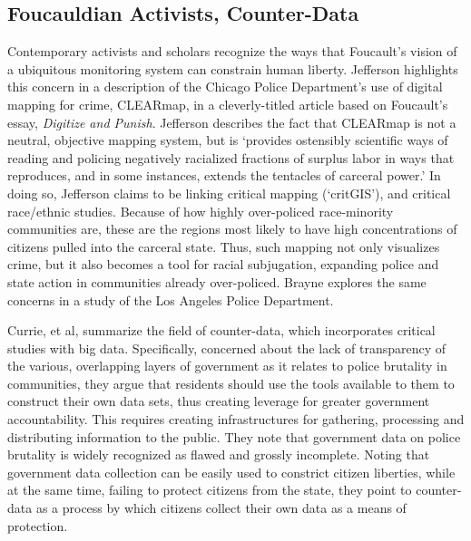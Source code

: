 \documentclass[sigconf]{acmart}
\begin{document}
\subsection{Foucauldian Activists, Counter-Data}
Contemporary activists and scholars recognize the ways that Foucault's vision of a ubiquitous monitoring system can constrain human liberty.  Jefferson highlights this concern in a description of the Chicago Police Department's use of digital mapping for crime, CLEARmap, in a cleverly-titled article based on Foucault's essay, {\em Digitize and Punish}. \cite{jefferson17} Jefferson describes the fact that CLEARmap is not a neutral, objective mapping system, but is `provides ostensibly scientific ways of reading and policing negatively racialized fractions of surplus labor in ways that reproduces, and in some instances, extends the tentacles of carceral power.'  In doing so, Jefferson claims to be linking critical mapping (`critGIS'), and critical race/ethnic studies.  Because of how highly over-policed race-minority communities are, these are the regions most likely to have high concentrations of citizens pulled into the carceral state. \cite{gilbert15,brunson05,rios11,crichlow14,payne17,chaney13,schneider14} Thus, such mapping not only visualizes crime, but it also becomes a tool for racial subjugation, expanding police and state action in communities already over-policed.  Brayne explores the same concerns in a study of the Los Angeles Police Department. \cite{brayne17}

Currie, et al, summarize the field of counter-data, which incorporates critical studies with big data. \cite{currie16} Specifically, concerned about the lack of transparency of the various, overlapping layers of government as it relates to police brutality in communities, they argue that residents should use the tools available to them to construct their own data sets, thus creating leverage for greater government accountability.  This requires creating infrastructures for gathering, processing and distributing information to the public.  They note that government data on police brutality is widely recognized as flawed and grossly incomplete. \cite{currie16,patterson16,dalton17}  Noting that government data collection can be easily used to constrict citizen liberties, while at the same time, failing to protect citizens from the state, they point to counter-data as a process by which citizens collect their own data as a means of protection.  
\end{document}
